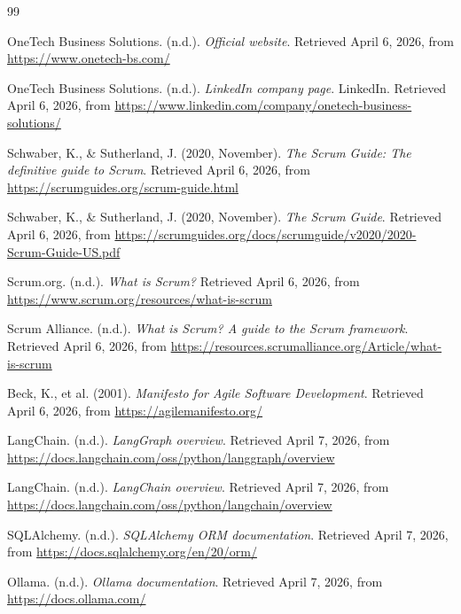 
\mtcaddchapter

\begin{thebibliography}{99}
	
	OneTech Business Solutions. (n.d.). \textit{Official website}. Retrieved April 6, 2026, from \url{https://www.onetech-bs.com/}
	
	OneTech Business Solutions. (n.d.). \textit{LinkedIn company page}. LinkedIn. Retrieved April 6, 2026, from \url{https://www.linkedin.com/company/onetech-business-solutions/}
	
	Schwaber, K., \& Sutherland, J. (2020, November). \textit{The Scrum Guide: The definitive guide to Scrum}. Retrieved April 6, 2026, from \url{https://scrumguides.org/scrum-guide.html}
	
	Schwaber, K., \& Sutherland, J. (2020, November). \textit{The Scrum Guide}. Retrieved April 6, 2026, from \url{https://scrumguides.org/docs/scrumguide/v2020/2020-Scrum-Guide-US.pdf}
	
	Scrum.org. (n.d.). \textit{What is Scrum?} Retrieved April 6, 2026, from \url{https://www.scrum.org/resources/what-is-scrum}
	
	Scrum Alliance. (n.d.). \textit{What is Scrum? A guide to the Scrum framework}. Retrieved April 6, 2026, from \url{https://resources.scrumalliance.org/Article/what-is-scrum}
	
	Beck, K., et al. (2001). \textit{Manifesto for Agile Software Development}. Retrieved April 6, 2026, from \url{https://agilemanifesto.org/}
	
	LangChain. (n.d.). \textit{LangGraph overview}. Retrieved April 7, 2026, from \url{https://docs.langchain.com/oss/python/langgraph/overview}
	
	LangChain. (n.d.). \textit{LangChain overview}. Retrieved April 7, 2026, from \url{https://docs.langchain.com/oss/python/langchain/overview}
	
	SQLAlchemy. (n.d.). \textit{SQLAlchemy ORM documentation}. Retrieved April 7, 2026, from \url{https://docs.sqlalchemy.org/en/20/orm/}
	
	Ollama. (n.d.). \textit{Ollama documentation}. Retrieved April 7, 2026, from \url{https://docs.ollama.com/}
	

\end{thebibliography}
